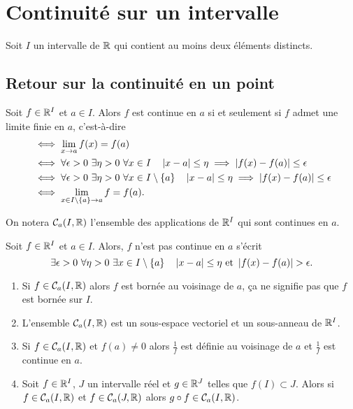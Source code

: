 \section{Continuité sur un intervalle}

Soit $I$ un intervalle de $\mathbb{R}$ qui contient au moins deux éléments distincts.

\subsection{Retour sur la continuité en un point}

\begin{rappel}
  Soit $f \in \mathbb{R}^I$ et $a \in I$. Alors $f$ est continue en $a$ si et seulement si $f$ admet une limite finie en $a$, c'est-à-dire
  \begin{align}
    &\iff \lim\limits_{x \to a} f(x) = f(a)\\
    &\iff \forall \epsilon>0 \ \exists \eta>0 \ \forall x \in I \quad \left\lvert x-a\right\rvert \leq \eta \implies \left\lvert f(x)-f(a)\right\rvert \leq \epsilon\\
    &\iff \forall \epsilon>0 \ \exists \eta>0 \ \forall x \in I\setminus\{a\} \quad \left\lvert x-a\right\rvert \leq \eta \implies \left\lvert f(x)-f(a)\right\rvert \leq \epsilon\\
    &\iff \lim\limits_{x \in I\setminus\{a\} \to a } f = f(a).
  \end{align}
\end{rappel}
On notera $\mathcal{C}_{a}(I,\mathbb{R})$ l'ensemble des applications de $\mathbb{R}^I$ qui sont continues en $a$.

\begin{rappel}
  Soit $f \in \mathbb{R}^I$ et $a \in I$. Alors, $f$ n'est pas continue en $a$ s'écrit
  \begin{equation}
    \exists \epsilon >0 \ \forall \eta >0 \ \exists x \in I\setminus\{a\} \quad \left\lvert x-a\right\rvert \leq \eta \text{~et~} \left\lvert f(x)-f(a)\right\rvert > \epsilon.
  \end{equation}
\end{rappel}

\begin{prop}
  \begin{enumerate}
  \item Si $f \in \mathcal{C}_{a}(I,\mathbb{R})$ alors $f$ est bornée au voisinage de $a$, ça ne signifie pas que $f$ est bornée sur $I$.
  \item L'ensemble $\mathcal{C}_{a}(I,\mathbb{R})$ est un sous-espace vectoriel et un sous-anneau de $\mathbb{R}^I$.
  \item Si $f \in \mathcal{C}_{a}(I,\mathbb{R})$ et $f(a) \neq 0$ alors $\frac{1}{f}$ est définie au voisinage de $a$ et $\frac{1}{f}$ est continue en $a$.
  \item Soit $f \in \mathbb{R}^I$, $J$ un intervalle réel et $g \in \mathbb{R}^J$ telles que $f(I) \subset J$. Alors si $f \in \mathcal{C}_{a}(I,\mathbb{R})$ et $f \in \mathcal{C}_{a}(J,\mathbb{R})$ alors $g \circ f \in \mathcal{C}_{a}(I,\mathbb{R})$.
  \end{enumerate}
\end{prop}

